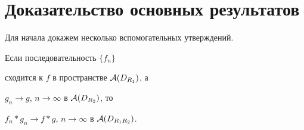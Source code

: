 \section{Доказательство основных результатов}





Для начала докажем несколько вспомогательных утверждений.





\begin{lem}


Если последовательность $\{f_n\}$


сходится к $f$ в пространстве ${\cal A}(D_{R_1})$, а 


$g_n \to g$, $n \to\infty$ в ${\cal A}(D_{R_2})$, то 


$f_n * g_n \to f*g$, $n \to\infty$ в ${\cal A}(D_{R_1 R_2} )$.


\end{lem}





